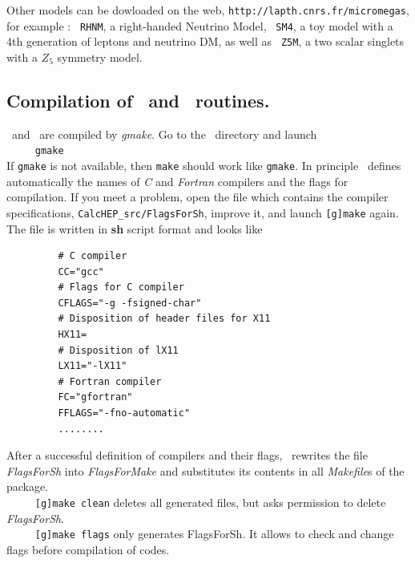 \documentclass[12pt,a4paper]{article}
\begin{document}
Other models can be dowloaded on the  web,  \verb|http://lapth.cnrs.fr/micromegas|, for example :
\verb| RHNM|, a right-handed Neutrino Model\cite{Belanger:2007dx},          
\verb| SM4|, a toy model with a 4th generation of leptons and neutrino DM, as well as
\verb| Z5M|, a two scalar singlets with  a $Z_5$ symmetry model.

\subsection{Compilation of \calchep\ and \micro\ routines.}
   \calchep\ and \micro\ are compiled by {\it gmake}. Go to the \micro\ directory
and launch\\
\verb|     gmake|\\
If {\tt gmake} is not available, then {\tt make} should work like {\tt gmake}.
In principle \micro\ defines automatically the names of {\it C} and {\it
Fortran} compilers and the flags for
compilation. If you meet a  problem, open the file which contains the compiler specifications, 
\verb|CalcHEP_src/FlagsForSh|,
 improve it, and launch {\tt [g]make} 
again. The file  is written in {\bf sh} script format and looks like
\begin{verbatim}
         # C compiler
         CC="gcc"
         # Flags for C compiler
         CFLAGS="-g -fsigned-char"
         # Disposition of header files for X11
         HX11=
         # Disposition of lX11
         LX11="-lX11"
         # Fortran compiler
         FC="gfortran"
         FFLAGS="-fno-automatic"
         ........
\end{verbatim}
After a successful definition of compilers and their flags,   \micro\ rewrites the file 
 {\it FlagsForSh} into {\it FlagsForMake} and substitutes its contents in all {\it
Makefile}s of the package.\\
\verb|     [g]make clean|    deletes all generated files, but asks permission to
delete {\it FlagsForSh}.\\
\verb|     [g]make flags|       only generates FlagsForSh. It allows to check and
change  flags before compilation of codes.
\end{document}
